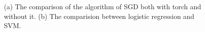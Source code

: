 \documentclass[10pt]{article}
\begin{document}
\begin{figure}[!h]
    \begin{center}
        \label{fig2}
    \end{center}
    \caption{(a) The comparison of the algorithm of SGD both with torch and without it. (b) The comparision between logistic regression and SVM.}
\end{figure}


\section{}
\end{document}

